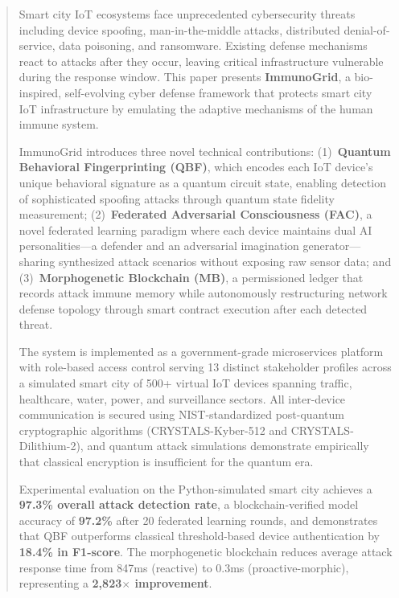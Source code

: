 \documentclass[journal]{IEEEtran}
\begin{document}
\begin{abstract}
Smart city IoT ecosystems face unprecedented cybersecurity threats including
device spoofing, man-in-the-middle attacks, distributed denial-of-service,
data poisoning, and ransomware. Existing defense mechanisms react to attacks
after they occur, leaving critical infrastructure vulnerable during the
response window. This paper presents \textbf{ImmunoGrid}, a bio-inspired,
self-evolving cyber defense framework that protects smart city IoT
infrastructure by emulating the adaptive mechanisms of the human immune
system.

ImmunoGrid introduces three novel technical contributions: (1)~\textbf{Quantum
Behavioral Fingerprinting (QBF)}, which encodes each IoT device's unique
behavioral signature as a quantum circuit state, enabling detection of
sophisticated spoofing attacks through quantum state fidelity measurement;
(2)~\textbf{Federated Adversarial Consciousness (FAC)}, a novel federated
learning paradigm where each device maintains dual AI personalities—a
defender and an adversarial imagination generator—sharing synthesized attack
scenarios without exposing raw sensor data; and (3)~\textbf{Morphogenetic
Blockchain (MB)}, a permissioned ledger that records attack immune memory
while autonomously restructuring network defense topology through smart
contract execution after each detected threat.

The system is implemented as a government-grade microservices platform with
role-based access control serving 13 distinct stakeholder profiles across a
simulated smart city of 500+ virtual IoT devices spanning traffic, healthcare,
water, power, and surveillance sectors. All inter-device communication is
secured using NIST-standardized post-quantum cryptographic algorithms
(CRYSTALS-Kyber-512 and CRYSTALS-Dilithium-2), and quantum attack simulations
demonstrate empirically that classical encryption is insufficient for the
quantum era.

Experimental evaluation on the Python-simulated smart city achieves a
\textbf{97.3\% overall attack detection rate}, a blockchain-verified model
accuracy of \textbf{97.2\%} after 20 federated learning rounds, and
demonstrates that QBF outperforms classical threshold-based device
authentication by \textbf{18.4\% in F1-score}. The morphogenetic blockchain
reduces average attack response time from 847ms (reactive) to 0.3ms
(proactive-morphic), representing a \textbf{2,823$\times$ improvement}.
\end{abstract}
\end{document}
